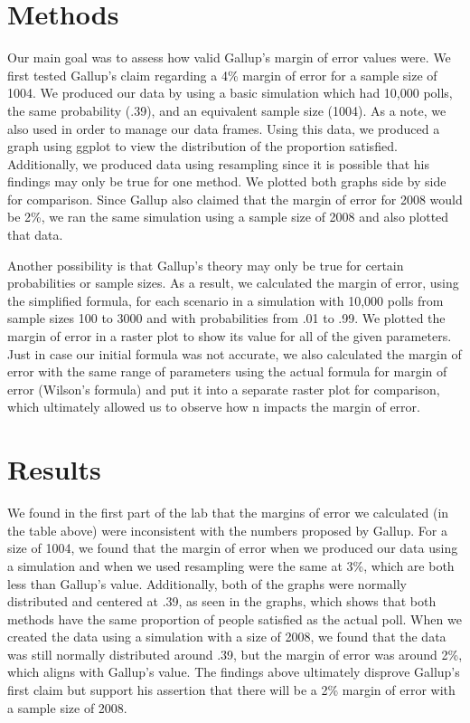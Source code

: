 \documentclass{article}\usepackage[]{graphicx}\usepackage[]{xcolor}
\begin{document}
\begin{multicols}{2}
\section{Methods}
Our main goal was to assess how valid Gallup's margin of error values were. We first tested Gallup's claim regarding a 4\% margin of error for a sample size of 1004. We produced our data by using a basic simulation which had 10,000 polls, the same probability (.39), and an equivalent sample size (1004). As a note, we also used \citep{tidyverse} in order to manage our data frames. Using this data, we produced a graph using ggplot \citep{ggplot2} to view the distribution of the proportion satisfied. Additionally, we produced data using resampling since it is possible that his findings may only be true for one method. We plotted both graphs side by side for comparison. Since Gallup also claimed that the margin of error for 2008 would be 2\%, we ran the same simulation using a sample size of 2008 and also plotted that data. 

Another possibility is that Gallup's theory may only be true for certain probabilities or sample sizes. As a result, we calculated the margin of error, using the simplified formula, for each scenario in a simulation with 10,000 polls from sample sizes 100 to 3000 and with probabilities from .01 to .99. We plotted the margin of error in a raster plot to show its value for all of the given parameters. Just in case our initial formula was not accurate, we also calculated the margin of error with the same range of parameters using the actual formula for margin of error (Wilson's formula) and put it into a separate raster plot for comparison, which ultimately allowed us to observe how n impacts the margin of error. 

\section{Results}
We found in the first part of the lab that the margins of error we calculated (in the table above) were inconsistent with the numbers proposed by Gallup. For a size of 1004, we found that the margin of error when we produced our data using a simulation and when we used resampling were the same at 3\%, which are both less than Gallup's value. Additionally, both of the graphs were normally distributed and centered at .39, as seen in the graphs, which shows that both methods have the same proportion of people satisfied as the actual poll. When we created the data using a simulation with a size of 2008, we found that the data was still normally distributed around .39, but the margin of error was around 2\%, which aligns with Gallup's value. The findings above ultimately disprove Gallup's first claim but support his assertion that there will be a 2\% margin of error with a sample size of 2008. 


\end{multicols}
\end{document}
